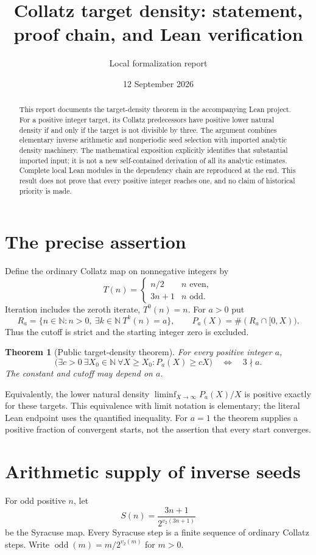 \documentclass[11pt]{article}
\title{Collatz target density: statement, proof chain, and Lean verification}
\author{Local formalization report}
\date{12 September 2026}
\newtheorem{theorem}{Theorem}
\newcommand{\N}{\mathbb N}
\begin{document}
\maketitle
\begin{abstract}
This report documents the target-density theorem in the accompanying Lean
project. For a positive integer target, its Collatz predecessors have positive
lower natural density if and only if the target is not divisible by three.
The argument combines elementary inverse arithmetic and nonperiodic seed
selection with imported analytic density machinery. The mathematical
exposition explicitly identifies that substantial imported input; it is not
a new self-contained derivation of all its analytic estimates. Complete local
Lean modules in the dependency chain are reproduced at the end. This result
does not prove that every positive integer reaches one, and no claim of
historical priority is made.
\end{abstract}
\tableofcontents
\section{The precise assertion}
Define the ordinary Collatz map on nonnegative integers by
\[
 T(n)=\begin{cases}n/2&n\text{ even},\\3n+1&n\text{ odd}.\end{cases}
\]
Iteration includes the zeroth iterate, $T^0(n)=n$. For $a>0$ put
\[
 R_a=\{n\in\N:n>0,\ \exists k\in\N\ T^k(n)=a\},\qquad
 P_a(X)=\#(R_a\cap[0,X)).
\]
Thus the cutoff is strict and the starting integer zero is excluded.
\begin{theorem}[Public target-density theorem]
For every positive integer $a$,
\[
 \bigl(\exists c>0\ \exists X_0\in\N\ \forall X\ge X_0:
 P_a(X)\ge cX\bigr)\quad\Longleftrightarrow\quad 3\nmid a.
\]
The constant and cutoff may depend on $a$.
\end{theorem}
Equivalently, the lower natural density $\liminf_{X\to\infty}P_a(X)/X$
is positive exactly for these targets. This equivalence with limit notation
is elementary; the literal Lean endpoint uses the quantified inequality.
For $a=1$ the theorem supplies a positive fraction of convergent starts,
not the assertion that every start converges.

\section{Arithmetic supply of inverse seeds}
For odd positive $n$, let
\[
 S(n)=\frac{3n+1}{2^{v_2(3n+1)}}
\]
be the Syracuse map. Every Syracuse step is a finite sequence of ordinary
Collatz steps. Write $\operatorname{odd}(m)=m/2^{v_2(m)}$ for $m>0$.
\end{document}
